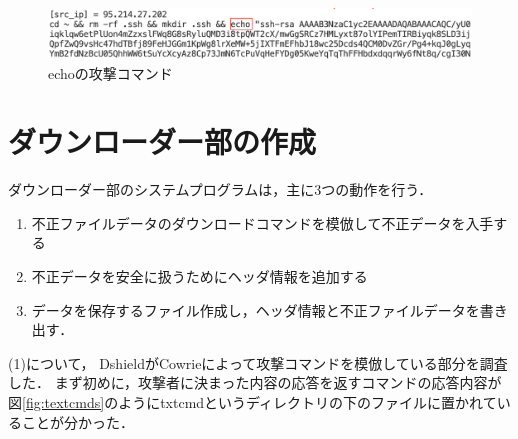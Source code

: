 \documentclass[dvipdfmx]{bta}
\begin{document}
\begin{figure}[htbp]

	\centering
 	\includegraphics[scale=0.7]{echo.png}
	\caption{echoの攻撃コマンド}\label{fig:echo}
	
\end{figure}

\chapter{ダウンローダー部の作成}
ダウンローダー部のシステムプログラムは，主に3つの動作を行う．

\renewcommand{\labelenumi}{(\arabic{enumi})}
\begin{enumerate}
	\item 不正ファイルデータのダウンロードコマンドを模倣して不正データを入手する
	\item 不正データを安全に扱うためにヘッダ情報を追加する
	\item データを保存するファイル作成し，ヘッダ情報と不正ファイルデータを書き出す．
\end{enumerate}

(1)について，
DshieldがCowrieによって攻撃コマンドを模倣している部分を調査した．
まず初めに，攻撃者に決まった内容の応答を返すコマンドの応答内容が図\ref{fig:textcmds}のようにtxtcmdというディレクトリの下のファイルに置かれていることが分かった．
\end{document}
